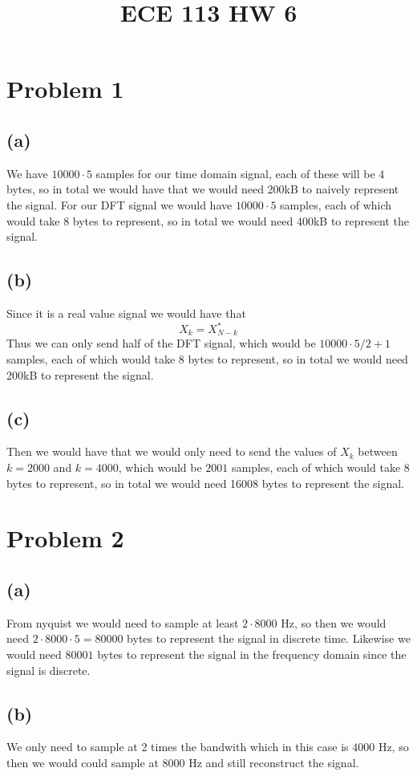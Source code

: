 
\title{ECE 113 HW 6}

\maketitle
\section*{Problem 1}
\subsection*{(a)}
We have $10000\cdot 5$ samples for our 
time domain signal, each of these will be $4$ bytes, 
so in total we would have that we would need 200kB to 
naively represent the signal. For our 
DFT signal we would have $10000 \cdot 5$ samples, each of
which would take $8$ bytes to represent, so in total 
we would need 400kB to represent the signal.
\subsection*{(b)}
Since it is a real value signal we would have that 
$$X_k=X_{N-k}^*$$
Thus we can only send half of the DFT signal,
which would be $10000 \cdot 5/2+1$ samples, each of which
would take $8$ bytes to represent, so in total we would
need 200kB to represent the signal.
\subsection*{(c)}
Then we would have that we would only 
need to send the values of 
$X_k$ between $k=2000$ and $k=4000$, which would be
$2001$ samples, each of which would take $8$ bytes to
represent, so in total we would need 16008 bytes to
represent the signal.
\section*{Problem 2}
\subsection*{(a)}
From nyquist we would need to sample at least $2\cdot 8000$ Hz, 
so then we would need $2\cdot 8000\cdot 5=80000$ bytes to represent
the signal in discrete time. Likewise we would need $80001$ bytes 
to represent the signal in the frequency domain since the signal is discrete.
\subsection*{(b)}
We only need to 
sample at 2 times the bandwith which in this case is 
$4000$ Hz, so then we would could sample at $8000$ Hz and still reconstruct the signal.
